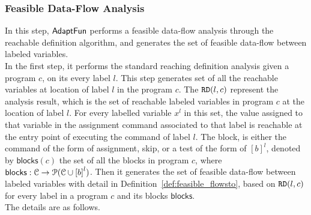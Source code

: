 \subsubsection{Feasible Data-Flow Analysis}
In this step,
 $\textsf{AdaptFun}$ performs a feasible data-flow analysis 
 through the reachable definition algorithm,
and generates the set of feasible data-flow between labeled variables.
\\
In the first step, 
it performs the standard reaching definition analysis given a program $c$, on its every label $l$.  This step generates set of all the reachable variables at location of label $l$ in the program $c$.
The $\mathtt{RD}(l, c)$ represent the analysis result, which is the set of 
reachable labeled variables in program $c$ at the location of label $l$.
For every labelled variable $x^l$ in this set, 
the value assigned to that variable
in the assignment command associated to that label is reachable at the entry point of  executing the command of label $l$.
The block, 
is either the command of the form of assignment, skip, or a test of the form of $[b]^{l}$, 
denoted by $\mathsf{blocks}(c)$
the set of all the blocks 
in program $c$, where  $\mathsf{blocks}: \cdom \to \mathcal{P}(\cdom \cup \clabel{\bexpr}^{l})$.
Then it generates the set of feasible data-flow between labeled variables with detail in Definition~\ref{def:feasible_flowsto}, 
based on $\mathtt{RD}(l, c)$ for every label in a program $c$ and its blocks $\mathsf{blocks}$.
\\
The details are as follows.
%
